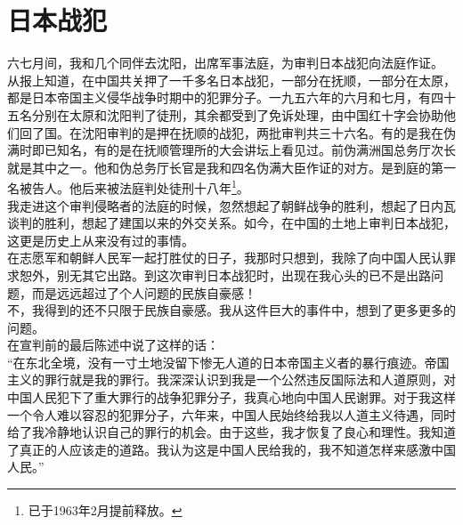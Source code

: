 \fancyhead[RO]{\thepage} %
\fancyhead[LE]{\thepage} %
\chapter*{日本战犯}
六七月间，我和几个同伴去沈阳，出席军事法庭，为审判日本战犯向法庭作证。\\

从报上知道，在中国共关押了一千多名日本战犯，一部分在抚顺，一部分在太原，都是日本帝国主义侵华战争时期中的犯罪分子。一九五六年的六月和七月，有四十五名分别在太原和沈阳判了徒刑，其余都受到了免诉处理，由中国红十字会协助他们回了国。在沈阳审判的是押在抚顺的战犯，两批审判共三十六名。有的是我在伪满时即已知名，有的是在抚顺管理所的大会讲坛上看见过。前伪满洲国总务厅次长就是其中之一。他和伪总务厅长官是我和四名伪满大臣作证的对方。是到庭的第一名被告人。他后来被法庭判处徒刑十八年\footnote{已于1963年2月提前释放。}。\\

我走进这个审判侵略者的法庭的时候，忽然想起了朝鲜战争的胜利，想起了日内瓦谈判的胜利，想起了建国以来的外交关系。如今，在中国的土地上审判日本战犯，这更是历史上从来没有过的事情。\\

在志愿军和朝鲜人民军一起打胜仗的日子，我那时只想到，我除了向中国人民认罪求恕外，别无其它出路。到这次审判日本战犯时，出现在我心头的已不是出路问题，而是远远超过了个人问题的民族自豪感！\\

不，我得到的还不只限于民族自豪感。我从这件巨大的事件中，想到了更多更多的问题。\\

在宣判前的最后陈述中说了这样的话：\\

“在东北全境，没有一寸土地没留下惨无人道的日本帝国主义者的暴行痕迹。帝国主义的罪行就是我的罪行。我深深认识到我是一个公然违反国际法和人道原则，对中国人民犯下了重大罪行的战争犯罪分子，我真心地向中国人民谢罪。对于我这样一个令人难以容忍的犯罪分子，六年来，中国人民始终给我以人道主义待遇，同时给了我冷静地认识自己的罪行的机会。由于这些，我才恢复了良心和理性。我知道了真正的人应该走的道路。我认为这是中国人民给我的，我不知道怎样来感激中国人民。”\\

